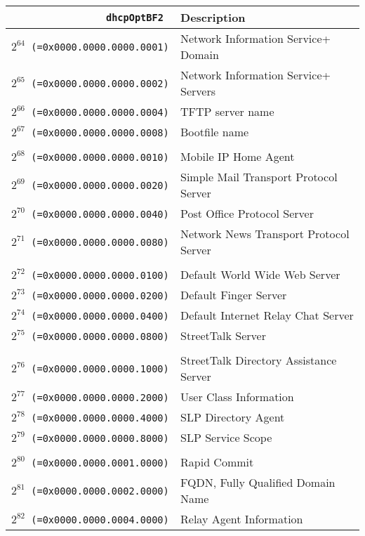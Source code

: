 \documentclass[documentation]{subfiles}
\begin{document}
\begin{small}
    \begin{longtable}{>{\tt}rl}
        \toprule
        {\bf dhcpOptBF2} & {\bf Description}\\
        \midrule\endhead%
        $2^{64}$  (=0x0000.0000.0000.0001) & Network Information Service+ Domain \\
        $2^{65}$  (=0x0000.0000.0000.0002) & Network Information Service+ Servers \\
        $2^{66}$  (=0x0000.0000.0000.0004) & TFTP server name \\
        $2^{67}$  (=0x0000.0000.0000.0008) & Bootfile name \\
        \\
        $2^{68}$  (=0x0000.0000.0000.0010) & Mobile IP Home Agent \\
        $2^{69}$  (=0x0000.0000.0000.0020) & Simple Mail Transport Protocol Server \\
        $2^{70}$  (=0x0000.0000.0000.0040) & Post Office Protocol Server \\
        $2^{71}$  (=0x0000.0000.0000.0080) & Network News Transport Protocol Server \\
        \\
        $2^{72}$  (=0x0000.0000.0000.0100) & Default World Wide Web Server \\
        $2^{73}$  (=0x0000.0000.0000.0200) & Default Finger Server \\
        $2^{74}$  (=0x0000.0000.0000.0400) & Default Internet Relay Chat Server \\
        $2^{75}$  (=0x0000.0000.0000.0800) & StreetTalk Server \\
        \\
        $2^{76}$  (=0x0000.0000.0000.1000) & StreetTalk Directory Assistance Server \\
        $2^{77}$  (=0x0000.0000.0000.2000) & User Class Information \\
        $2^{78}$  (=0x0000.0000.0000.4000) & SLP Directory Agent \\
        $2^{79}$  (=0x0000.0000.0000.8000) & SLP Service Scope \\
        \\
        $2^{80}$  (=0x0000.0000.0001.0000) & Rapid Commit \\
        $2^{81}$  (=0x0000.0000.0002.0000) & FQDN, Fully Qualified Domain Name \\
        $2^{82}$  (=0x0000.0000.0004.0000) & Relay Agent Information \\

\end{longtable}
\end{small}
\end{document}
